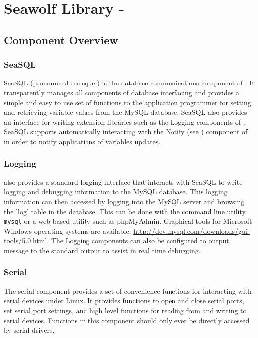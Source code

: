 
\newpage
\section{Seawolf Library - \libseawolf{}} \label{libseawolf}
\subsection{Component Overview} \label{libseawolfcomponents}
\subsubsection{SeaSQL} \label{overviewseasql}
SeaSQL (pronounced see-squel) is the database communications component of
\libseawolf. It transparently manages all components of database interfacing and
provides a simple and easy to use set of functions to the application programmer
for setting and retrieving variable values from the MySQL database. SeaSQL also
provides an interface for writing extension libraries such as the Logging
components of \libseawolf{}. SeaSQL supports automatically interacting with the
Notify (see ) component of \libseawolf{} in
order to notify applications of variables updates.

\subsubsection{Logging} \label{overviewlogging}
\libseawolf{} also provides a standard logging interface that interacts with
SeaSQL to write logging and debugging information to the MySQL database. This
logging information can then accessed by logging into the MySQL server and
browsing the 'log' table in the database. This can be done with the command line
utility \texttt{mysql} or a web-based utility such as phpMyAdmin. Graphical
tools for Microsoft Windows operating systems are available,
\url{http://dev.mysql.com/downloads/gui-tools/5.0.html}. The Logging components
can also be configured to output message to the standard output to assist in
real time debugging.

\subsubsection{Serial} \label{overviewserial}
The serial component provides a set of convenience functions for interacting
with serial devices under Linux. It provides functions to open and close serial
ports, set serial port settings, and high level functions for reading from and
writing to serial devices. Functions in this component should only ever be
directly accessed by serial drivers.

